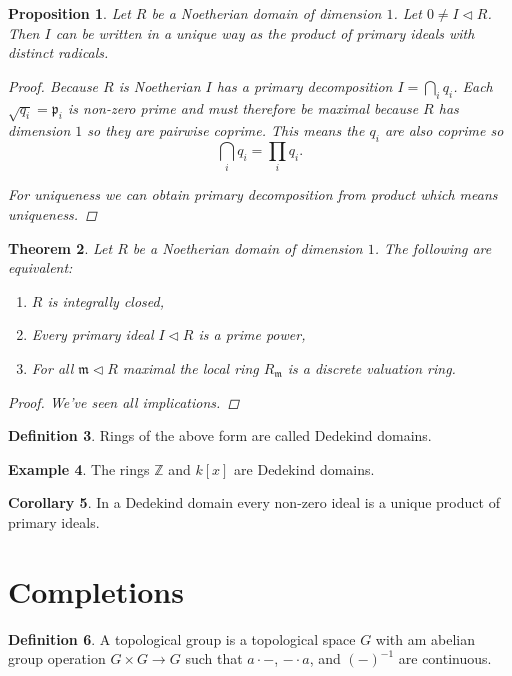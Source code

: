 \documentclass{article}
\newcommand{\Z}{\mathbb{Z}}
\newcommand{\maxid}{\mathfrak{m}}
\newcommand{\primeid}{\mathfrak{p}}
\newcommand{\ideal}{\triangleleft}
\newtheorem{theorem}{Theorem}[section]
\newtheorem{proposition}[theorem]{Proposition}
\theoremstyle{definition}
\newtheorem{definition}[theorem]{Definition}
\newtheorem{example}[theorem]{Example}
\newtheorem{corollary}[theorem]{Corollary}
\begin{document}
\begin{proposition}
    Let \(R\) be a Noetherian domain of dimension \(1\). Let \(0\neq I\ideal
    R\). Then \(I\) can be written in a unique way as the product of primary ideals
    with distinct radicals.

    \begin{proof}
        Because \(R\) is Noetherian \(I\) has a primary decomposition
        \(I=\bigcap_{i}q_{i}\). Each \(\sqrt{q_{i}}=\primeid_{i}\) is non-zero
        prime and must therefore be maximal because \(R\) has dimension \(1\) so
        they are pairwise coprime. This means the \(q_{i}\) are also coprime so
        \[
            \bigcap_{i}q_{i}=\prod_{i}q_{i}.
        \]

        For uniqueness we can obtain primary decomposition from product
        which means uniqueness.
    \end{proof}
\end{proposition}

\begin{theorem}
    Let \(R\) be a Noetherian domain of dimension \(1\). The following are
    equivalent:
    \begin{enumerate}
        \item \(R\) is integrally closed,
        \item Every primary ideal \(I\ideal R\) is a prime power,
        \item For all \(\maxid\ideal R\) maximal the local ring \(R_{\maxid}\)
              is a discrete valuation ring.
    \end{enumerate}

    \begin{proof}
        We've seen all implications.
    \end{proof}
\end{theorem}

\begin{definition}
    Rings of the above form are called Dedekind domains.
\end{definition}

\begin{example}
    The rings \(\Z\) and \(k[x]\) are Dedekind domains.
\end{example}

\begin{corollary}
    In a Dedekind domain every non-zero ideal is a unique product of primary
    ideals.
\end{corollary}

\section{Completions}
\begin{definition}
    A topological group is a topological space \(G\) with am abelian group
    operation \(G\times G\to G\) such that \(a\cdot-\), \(-\cdot a\), and
    \((-)^{-1}\) are continuous.
\end{definition}
\end{document}
